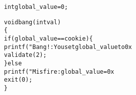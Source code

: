\begin{alltt}
int global_value = 0;

void bang(int val)
\verb:{:
    if (global_value == cookie) \verb:{:
        printf("Bang!: You set global_value to 0x%x\verb:\n:", global_value);
        validate(2);
    \verb:}: else
        printf("Misfire: global_value = 0x%x\verb:\n:", global_value);
    exit(0);
\verb:}:
\end{alltt}
